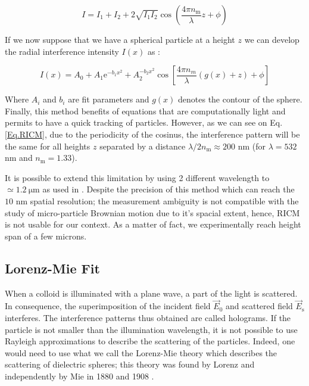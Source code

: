 \begin{equation}
	I = I_1 + I_2 + 2 \sqrt{I_1 I_2} 
	\cos 
	\left(
	\frac{4 \pi n_{\mathrm{m}}}{\lambda} z + \phi	
	\right)
\end{equation}


If we now suppose that we have a spherical particle at a height $z$ we can develop the radial interference intensity $I(x)$ as \cite{ raedler_measurement_1992}:

\begin{equation}
	I(x) = A_0 + A_1 \mathrm{e}^{-b_1 x^2} + A_2^{-b_2 x^2} \cos \left[ \frac{4\pi n_m}{\lambda}\left( g(x) + z \right) + \phi \right]
	\label{Eq.RICM}
\end{equation}

Where $A_i$ and $b_i$ are fit parameters and $g(x)$ denotes the contour of the sphere.
Finally, this method benefits  of equations that are computationally light and permits to have a quick tracking of particles. However, as we can see on Eq.\ref{Eq.RICM}, due to the periodicity of the cosinus, the interference pattern will be the same for all heights $z$ separated by a distance $\lambda / 2n_\mathrm{m} \approx 200 $ nm (for $\lambda = 532$ nm and $n_{\mathrm{m}} = 1.33$). 

It is possible to extend this limitation by using 2 different wavelength to $\simeq 1.2 ~ \mathrm{\mu m}$ as used in \cite{davies_elastohydrodynamic_2018}. Despite the precision of this method which can reach the $10$ nm spatial resolution; the measurement ambiguity is not compatible with the study of micro-particle Brownian motion due to it's spacial extent, hence, \gls{RICM} is not usable for our context. As a matter of fact, we experimentally reach height span of a few microns. 



\subsection{Lorenz-Mie Fit}
\label{chap:LM_fit}

When a colloid is illuminated with a plane wave, a part of the light is scattered. In consequence, the superimposition of the incident field $\vec{E}_0$ and scattered field $\vec{E}_\mathrm{s}$ interferes. The interference patterns thus obtained are called holograms. If the particle is not smaller than the illumination wavelength, it is not possible to use Rayleigh approximations \cite{strutt_lviii_1871} to describe the scattering of the particles. Indeed, one would need to use what we call the Lorenz-Mie theory which describes the scattering of dielectric spheres; this theory was found by Lorenz and independently by Mie in 1880 and 1908 \cite{lorenz_lysbevaegelsen_1890, mie_beitrage_1908}. 

